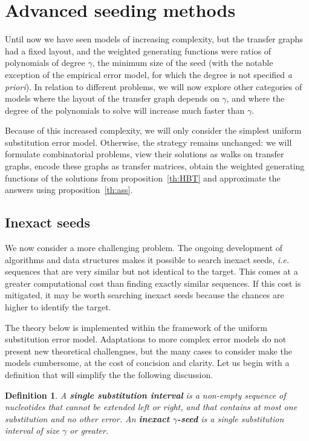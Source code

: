 \documentclass{article}
\newtheorem{definition}{Definition}
\begin{document}
\section{Advanced seeding methods}

Until now we have seen models of increasing complexity, but the transfer
graphs had a fixed layout, and the weighted generating functions were
ratios of polynomials of degree $\gamma$, the minimum size of the seed
(with the notable exception of the empirical error model, for which the
degree is not specified \textit{a priori}). In relation to different
problems, we will now explore other categories of models where the layout
of the transfer graph depends on $\gamma$, and where the degree of the
polynomials to solve will increase much faster than $\gamma$.

Because of this increased complexity, we will only consider the simplest
uniform substitution error model. Otherwise, the strategy remains
unchanged: we will formulate combinatorial problems, view their solutions
as walks on transfer graphs, encode these graphs as transfer matrices,
obtain the weighted generating functions of the solutions from
proposition~\ref{th:HBT} and approximate the answers using
proposition~\ref{th:ass}.

\subsection{Inexact seeds}

We now consider a more challenging problem. The ongoing development of
algorithms and data structures makes it possible to search inexact seeds,
\textit{i.e.} sequences that are very similar but not identical to the
target. This comes at a greater computational cost than finding exactly
similar sequences. If this cost is mitigated, it may be worth searching
inexact seeds because the chances are higher to identify the target.

The theory below is implemented within the framework of the uniform
substitution error model. Adaptations to more complex error models do not
present new theoretical challengnes, but the many cases to consider make
the models cumbersome, at the cost of concision and clarity. Let us begin
with a definition that will simplify the the following discussion.

\begin{definition}
A \textbf{single substitution interval} is a non-empty sequence of
nucleotides that cannot be extended left or right, and that contains at
most one substitution and no other error. An \textbf{inexact
$\gamma$-seed} is a single substitution interval of size $\gamma$ or
greater.
\end{definition}
\end{document}
